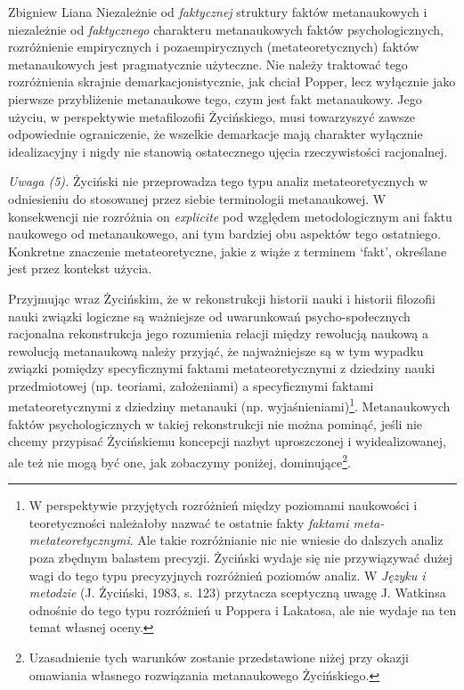 \begin{artplenv}{Zbigniew Liana}
Niezależnie od \textit{faktycznej} struktury faktów metanaukowych i niezależnie od \textit{faktycznego} charakteru
metanaukowych faktów psychologicznych, rozróżnienie empirycznych i pozaempirycznych (metateoretycznych) faktów
metanaukowych jest pragmatycznie użyteczne. Nie należy traktować tego rozróżnienia skrajnie demarkacjonistycznie, jak
chciał Popper, lecz wyłącznie jako pierwsze przybliżenie metanaukowe tego, czym jest fakt metanaukowy. Jego użyciu, w
perspektywie metafilozofii Życińskiego, musi towarzyszyć zawsze odpowiednie ograniczenie, że wszelkie demarkacje mają
charakter wyłącznie idealizacyjny i nigdy nie stanowią ostatecznego ujęcia rzeczywistości racjonalnej.

\textit{Uwaga (5).} Życiński nie przeprowadza tego typu analiz metateoretycznych w odniesieniu do stosowanej przez siebie
terminologii metanaukowej. W konsekwencji nie rozróżnia on \textit{explicite} pod względem metodologicznym ani faktu
naukowego od metanaukowego, ani tym bardziej obu aspektów tego ostatniego. Konkretne znaczenie metateoretyczne, jakie z
wiąże z terminem ‘fakt’, określane jest przez kontekst użycia.

Przyjmując wraz Życińskim, że w rekonstrukcji historii nauki i historii filozofii nauki związki logiczne są ważniejsze
od uwarunkowań psycho-społecznych racjonalna rekonstrukcja jego rozumienia relacji między rewolucją naukową a rewolucją
metanaukową należy przyjąć, że najważniejsze są w tym wypadku związki pomiędzy specyficznymi faktami metateoretycznymi
z dziedziny nauki przedmiotowej (np. teoriami, założeniami) a specyficznymi faktami metateoretycznymi z dziedziny
metanauki (np. wyjaśnieniami)\footnote{W perspektywie przyjętych rozróżnień między poziomami naukowości i
	teoretyczności należałoby nazwać te ostatnie fakty \textit{faktami meta-metateoretycznymi}. Ale takie rozróżnianie nic
	nie wniesie do dalszych analiz poza zbędnym balastem precyzji. Życiński wydaje się nie przywiązywać dużej wagi do tego
	typu precyzyjnych rozróżnień poziomów analiz. W \textit{Języku i metodzie} \label{ref:RNDqQTlKikSxt}(J. Życiński, 1983,
	s. 123) przytacza sceptyczną uwagę J. Watkinsa odnośnie do tego typu rozróżnień u Poppera i Lakatosa, ale nie wydaje na
	ten temat własnej oceny.}. Metanaukowych faktów psychologicznych w takiej rekonstrukcji nie można pominąć, jeśli nie
chcemy przypisać Życińskiemu koncepcji nazbyt uproszczonej i wyidealizowanej, ale też nie mogą być one, jak zobaczymy
poniżej, dominujące\footnote{Uzasadnienie tych warunków zostanie przedstawione niżej przy okazji omawiania własnego
	rozwiązania metanaukowego Życińskiego.}.


\end{artplenv}
